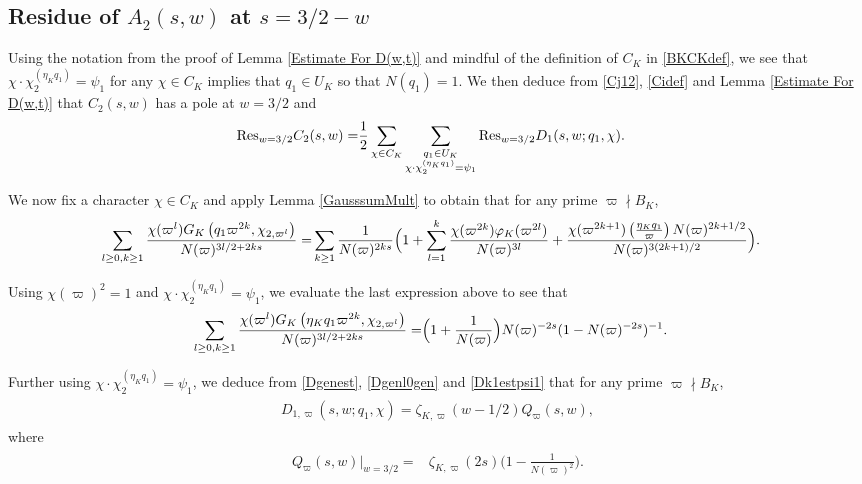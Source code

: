 \documentclass[twoside,leqno,10pt, A4]{amsart}
\begin{document}
\subsection{Residue of $A_2(s,w)$ at $s=3/2-w$}
\label{sec:resAw}

Using the notation from the proof of Lemma \ref{Estimate For D(w,t)} and mindful of the definition of $C_K$ in \eqref{BKCKdef}, we see that $\chi \cdot \chi^{(\eta_K q_1)}_2=\psi_1$ for any $\chi \in C_K$ implies that $q_1 \in U_K$ so that $N(q_1)=1$. We then deduce from \eqref{Cj12},  \eqref{Cidef} and Lemma \ref{Estimate For D(w,t)} that $C_2(s, w)$ has a pole at $w=3/2$ and
\begin{align}
\label{Cres}
\begin{split}
\mathrm{Res}_{w=3/2}C_2(s,w)=& \frac {1}{2}\sum_{\chi \in C_K}\sum_{\substack{ q_1 \in U_K \\ \chi \cdot \chi^{(\eta_K q_1)}_2=\psi_1}}\mathrm{Res}_{w=3/2}D_1(s,w;q_1, \chi).
\end{split}
\end{align}

  We now fix a character $\chi \in C_K$ and apply Lemma \ref{GausssumMult} to obtain that for any prime $\varpi \nmid B_K$, 	
\begin{align}
\label{Dk1estpsi1}	
\begin{split}
 \sum_{l \geq 0, k \geq 1}\frac{ \chi(\varpi^{l})G_K\left( q_1\varpi^{2k}, \chi_{2, \varpi^l}\right)  }{N(\varpi)^{3l/2+2ks}} =& \sum_{k \geq
1}\frac {1}{N(\varpi)^{2ks}}\Big (1+\sum^k_{l=1}\frac{ \chi(\varpi^{2k}) \varphi_K(\varpi^{2l}) }{N(\varpi)^{3l}}+\frac {\chi(\varpi^{2k+1})
\left(\frac{\eta_Kq_1}{\varpi}\right) N(\varpi)^{2k+1/2}}{N(\varpi)^{3(2k+1)/2}} \Big ).
\end{split}
\end{align}

  Using $\chi(\varpi)^2=1$ and $\chi \cdot \chi^{(\eta_Kq_1)}_2=\psi_1$, we evaluate the last expression above to see that
\begin{align*}
\begin{split}
 \sum_{l \geq 0, k \geq 1}\frac{ \chi(\varpi^{l})G_K\left( \eta_Kq_1\varpi^{2k}, \chi_{2, \varpi^l}\right)  }{N(\varpi)^{3l/2+2ks}}
= & \Big(1+\frac 1{N(\varpi)} \Big)N(\varpi)^{-2s}(1-N(\varpi)^{-2s})^{-1}.
\end{split}
\end{align*}

  Further using $\chi \cdot \chi^{(\eta_Kq_1)}_2=\psi_1$, we deduce from \eqref{Dgenest}, \eqref{Dgenl0gen} and \eqref{Dk1estpsi1} that for any prime $\varpi \nmid B_K$,
\begin{align}
\label{D1pexp}	
\begin{split}
   D_{1,\varpi}(s, w; q_1,  \chi)=  \zeta_{K,\varpi}(w-1/2)Q_{\varpi}(s, w),
\end{split}
\end{align}
  where
\begin{align}
\label{Qpexp}	
\begin{split}
   Q_{\varpi}(s, w)\Big |_{w=3/2} =& \zeta_{K, \varpi}(2s)\Big(1-\frac {1}{N(\varpi)^{2}} \Big).
\end{split}
\end{align}
	
\end{document}
